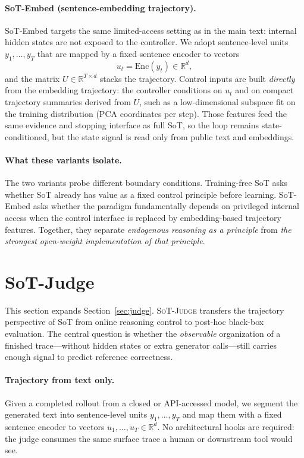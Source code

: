 \paragraph{SoT-Embed (sentence-embedding trajectory).}
SoT-Embed targets the same limited-access setting as in the main text: internal hidden states are not exposed to the controller.
We adopt sentence-level units \(y_1,\dots,y_T\) that are mapped by a fixed sentence encoder to vectors
\begin{equation}
u_t = \mathrm{Enc}(y_t)\in\mathbb{R}^d,
\label{eq:app_proxy_u}
\end{equation}
and the matrix \(U\in\mathbb{R}^{T\times d}\) stacks the trajectory.
Control inputs are built \emph{directly} from the embedding trajectory: the controller conditions on \(u_t\) and on compact trajectory summaries derived from \(U\), such as a low-dimensional subspace fit on the training distribution (PCA coordinates per step).
Those features feed the same evidence and stopping interface as full SoT, so the loop remains state-conditioned, but the state signal is read only from public text and embeddings.

\paragraph{What these variants isolate.}
The two variants probe different boundary conditions. 
Training-free SoT asks whether SoT already has value as a fixed control principle before learning. 
SoT-Embed asks whether the paradigm fundamentally depends on privileged internal access when the control interface is replaced by embedding-based trajectory features. 
Together, they separate \emph{endogenous reasoning as a principle} from \emph{the strongest open-weight implementation of that principle}.

\section{SoT-Judge}
\label{app:sot_judge}

This section expands Section~\ref{sec:judge}. 
\textsc{SoT-Judge} transfers the trajectory perspective of SoT from online reasoning control to post-hoc black-box evaluation. 
The central question is whether the \emph{observable} organization of a finished trace---without hidden states or extra generator calls---still carries enough signal to predict reference correctness.

\paragraph{Trajectory from text only.}
Given a completed rollout from a closed or API-accessed model, we segment the generated text into sentence-level units \(y_1,\dots,y_T\) and map them with a fixed sentence encoder to vectors \(u_1,\dots,u_T\in\mathbb{R}^d\). 
No architectural hooks are required: the judge consumes the same surface trace a human or downstream tool would see.

